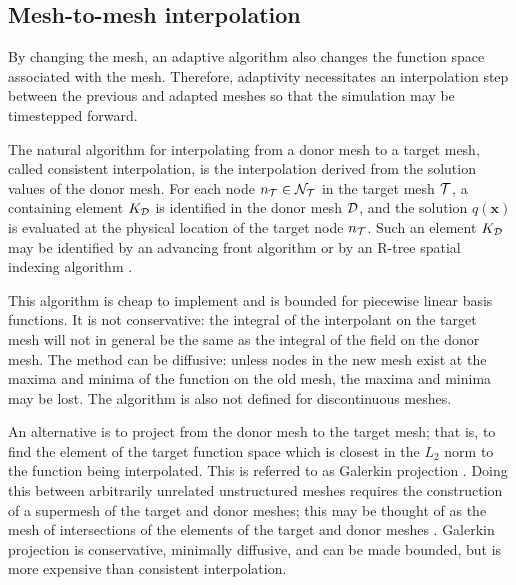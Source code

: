\subsection{Mesh-to-mesh interpolation}
By changing the mesh, an adaptive algorithm also changes
the function space associated with the mesh. Therefore, adaptivity
necessitates an interpolation step between the previous and adapted
meshes so that the simulation may be timestepped forward.

The natural algorithm for interpolating from a donor mesh to a target
mesh, called consistent interpolation, is the interpolation derived
from the solution values of the donor mesh. For each node $n_{\cal{T}}
\in \cal{N}_{\cal{T}}$ in the target mesh $\cal{T}$, a containing
element $K_{\cal{D}}$ is identified in the donor mesh $\cal{D}$, and
the solution $q(\pmb{x})$ is evaluated at the physical location of the
target node $n_{\cal{T}}$. Such an element $K_{\cal{D}}$ may be
identified by an advancing front algorithm \citep{lohner1995} or by an
R-tree spatial indexing algorithm \citep{guttman1984}.

This algorithm is cheap to implement and is bounded for piecewise
linear basis functions. It is not conservative: the integral of the
interpolant on the target mesh will not in general be the same as the
integral of the field on the donor mesh. The method can be diffusive:
unless nodes in the new mesh exist at the maxima and minima of the
function on the old mesh, the maxima and minima may be lost. The
algorithm is also not defined for discontinuous meshes.

An alternative is to project from the donor mesh to the target mesh;
that is, to find the element of the target function space which is
closest in the $L_2$ norm to the function being interpolated. This is
referred to as Galerkin projection \citep{george1998}. Doing this
between arbitrarily unrelated unstructured meshes requires the
construction of a supermesh of the target and donor meshes; this may
be thought of as the mesh of intersections of the elements of the
target and donor meshes
\citep{farrell2009a,farrell2011conservative}. Galerkin projection is
conservative, minimally diffusive, and can be made bounded, but is
more expensive than consistent interpolation.
